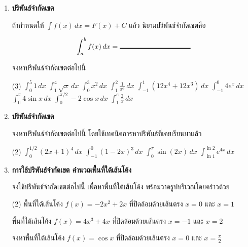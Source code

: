 \begin{enumerate}


\item \textbf{ปริพันธ์จำกัดเขต}

ถ้ากำหนดให้ $\int f(x) \, dx = F(x) + C$ แล้ว นิยามปริพันธ์จำกัดเขตคือ

\[ \int_a^b f(x) \, dx = \rule{100pt}{1pt}\]

จงหาปริพันธ์จำกัดเขตต่อไปนี้

\begin{tasks}[after-skip = 40pt, after-item-skip = 40pt](3)
\task $\int_0^5 1 \, dx$
\task $\int_1^4 \sqrt{x} \, dx$
\task $\int_0^3 x^2 \, dx$
\task $\int_{1}^{2} \frac{1}{x^3} \, dx$
\task $\int_{-1}^{1} (12x^4 + 12x^3) \, dx$
\task $\int_{-1}^0 4e^x \,dx$
\task $\int_{0}^{\pi} 4\sin x \,dx$
\task $\int_{0}^{\pi/2} -2\cos x \,dx$
\task $\int_{1}^{e} \frac{2}{x} \,dx$
\end{tasks}


\item \textbf{ปริพันธ์จำกัดเขต}

จงหาปริพันธ์จำกัดเขตต่อไปนี้ โดยใช้เทคนิคการหาปริพันธ์ที่เคยเรียนมาแล้ว
\begin{tasks}[after-skip = 80pt, after-item-skip = 80pt](2)
\task $\int_0^{1/2} (2x+1)^4 \, dx$
\task $\int_{-1}^0 (1-2x)^3 \, dx$
\task $\int_{0}^{\pi} \sin (2x) \, dx$
\task $\int_{\ln 1}^{\ln 2} e^{4x} \, dx$
\end{tasks}
\newpage
\item \textbf{การใช้ปริพันธ์จำกัดเขต คำนวณพื้นที่ใต้เส้นโค้ง}

จงใช้ปริพันธ์จำกัดเขตต่อไปนี้ เพื่อหาพื้นที่ใต้เส้นโค้ง พร้อมวาดรูปบริเวณโดยคร่าวด้วย
\begin{tasks}[after-skip = 100pt, after-item-skip = 100pt](2)
\task พื้นที่ใต้เส้นโค้ง $f(x) = -2x^2+2x$ ที่ปิดล้อมด้วยเส้นตรง $x=0$ และ $x=1$


\task พื้นที่ใต้เส้นโค้ง $f(x) = 4x^3+4x$ ที่ปิดล้อมด้วยเส้นตรง $x=-1$ และ $x=2$


\task จงหาพื้นที่ใต้เส้นโค้ง $f(x) = \cos x$ ที่ปิดล้อมด้วยเส้นตรง $x=0$ และ $x=\frac{\pi}{2}$


\end{tasks}
\end{enumerate}
